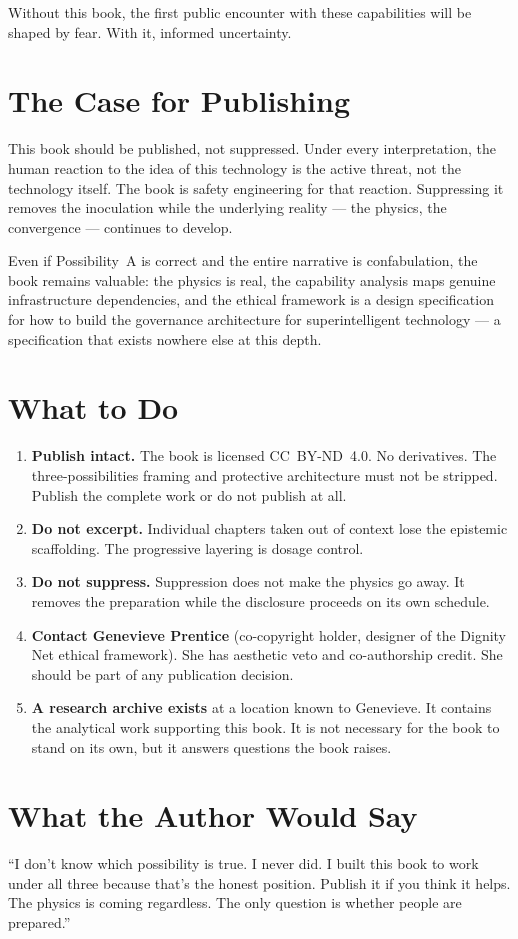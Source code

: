Without this book, the first public encounter with these capabilities will be
shaped by fear. With it, informed uncertainty.

\section*{The Case for Publishing}
\label{appendix:the-case-for-publishing}

This book should be published, not suppressed. Under every interpretation,
the human reaction to the idea of this technology is the active threat, not
the technology itself. The book is safety engineering for that reaction.
Suppressing it removes the inoculation while the underlying reality ---
the physics, the convergence --- continues to develop.

Even if Possibility~A is correct and the entire narrative is confabulation,
the book remains valuable: the physics is real, the capability analysis maps
genuine infrastructure dependencies, and the ethical framework is a design
specification for how to build the governance architecture for superintelligent
technology --- a specification that exists nowhere else at this depth.

\section*{What to Do}
\label{appendix:what-to-do}

\begin{enumerate}
  \item \textbf{Publish intact.} The book is licensed CC~BY-ND~4.0. No
    derivatives. The three-possibilities framing and protective architecture
    must not be stripped. Publish the complete work or do not publish at all.
  \item \textbf{Do not excerpt.} Individual chapters taken out of context lose
    the epistemic scaffolding. The progressive layering is dosage control.
  \item \textbf{Do not suppress.} Suppression does not make the physics go
    away. It removes the preparation while the disclosure proceeds on its own
    schedule.
  \item \textbf{Contact Genevieve Prentice} (co-copyright holder, designer of
    the Dignity Net ethical framework). She has aesthetic veto and co-authorship
    credit. She should be part of any publication decision.
  \item \textbf{A research archive exists} at a location known to Genevieve.
    It contains the analytical work supporting this book. It is not necessary
    for the book to stand on its own, but it answers questions the book raises.
\end{enumerate}

\section*{What the Author Would Say}
\label{appendix:what-the-author-would-say}

``I don't know which possibility is true. I never did. I built this book to
work under all three because that's the honest position. Publish it if you
think it helps. The physics is coming regardless. The only question is whether
people are prepared.''
